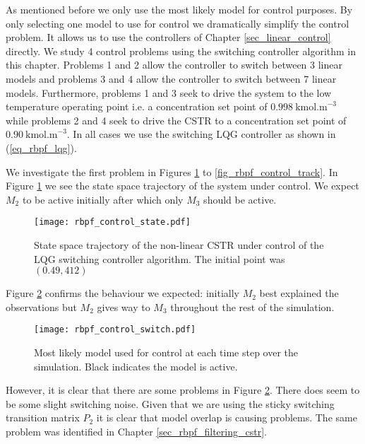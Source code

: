 As mentioned before we only use the most likely model for control purposes. By only selecting one model to use for control we dramatically simplify the control problem. It allows us to use the controllers of Chapter \ref{sec_linear_control} directly. We study 4 control problems using the switching controller algorithm in this chapter. Problems 1 and 2 allow the controller to switch between 3 linear models and problems 3 and 4 allow the controller to switch between 7 linear models. Furthermore, problems 1 and 3 seek to drive the system to the low temperature operating point i.e. a concentration set point of $0.998~\text{kmol.m}^{-3}$ while problems 2 and 4 seek to drive the CSTR to a concentration set point of $0.90~\text{kmol.m}^{-3}$. In all cases we use the switching LQG controller as shown in (\ref{eq_rbpf_lqg}).

We investigate the first problem in Figures \ref{fig_rbpf_control_state} to \ref{fig_rbpf_control_track}. In Figure \ref{fig_rbpf_control_state} we see the state space trajectory of the system under control. We expect $M_2$ to be active initially after which only $M_3$ should be active.
\begin{figure}[H] 
\centering
\texttt{[image: rbpf\_control\_state.pdf]}
\caption{State space trajectory of the non-linear CSTR under control of the LQG switching controller algorithm. The initial point was $(0.49, 412)$}
\label{fig_rbpf_control_state}
\end{figure}
Figure \ref{fig_rbpf_control_switch} confirms the behaviour we expected: initially $M_2$ best explained the observations but $M_2$ gives way to $M_3$ throughout the rest of the simulation.   
\begin{figure}[H] 
\centering
\texttt{[image: rbpf\_control\_switch.pdf]}
\caption{Most likely model used for control at each time step over the simulation. Black indicates the model is active.}
\label{fig_rbpf_control_switch}
\end{figure}
However, it is clear that there are some problems in Figure \ref{fig_rbpf_control_switch}. There does seem to be some slight switching noise. Given that we are using the sticky switching transition matrix $P_2$ it is clear that model overlap is causing problems. The same problem was identified in Chapter \ref{sec_rbpf_filtering_cstr}.

